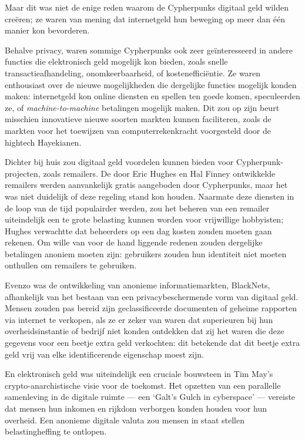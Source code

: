 \documentclass[
  a5paper,
  smalldemyvopaper,11pt,twoside,onecolumn,openright,extrafontsizes]{memoir}
\begin{document}
Maar dit was niet de enige reden waarom de Cypherpunks digitaal geld
wilden creëren; ze waren van mening dat internetgeld hun beweging op
meer dan één manier kon bevorderen.

Behalve privacy, waren sommige Cypherpunks ook zeer geïnteresseerd in
andere functies die elektronisch geld mogelijk kon bieden, zoals snelle
transactieafhandeling, onomkeerbaarheid, of kostenefficiëntie. Ze waren
enthousiast over de nieuwe mogelijkheden die dergelijke functies
mogelijk konden maken: internetgeld kon online diensten en spellen ten
goede komen, speculeerden ze, of \emph{machine-to-machine} betalingen
mogelijk maken. Dit zou op zijn beurt misschien innovatieve nieuwe
soorten markten kunnen faciliteren, zoals de markten voor het toewijzen
van computerrekenkracht voorgesteld door de hightech Hayekianen.

Dichter bij huis zou digitaal geld voordelen kunnen bieden voor
Cypherpunk-projecten, zoals remailers. De door Eric Hughes en Hal Finney
ontwikkelde remailers werden aanvankelijk gratis aangeboden door
Cypherpunks, maar het was niet duidelijk of deze regeling stand kon
houden. Naarmate deze diensten in de loop van de tijd populairder
werden, zou het beheren van een remailer uiteindelijk een te grote
belasting kunnen worden voor vrijwillige hobbyisten; Hughes verwachtte
dat beheerders op een dag kosten zouden moeten gaan rekenen. Om wille
van voor de hand liggende redenen zouden dergelijke betalingen anoniem
moeten zijn: gebruikers zouden hun identiteit niet moeten onthullen om
remailers te gebruiken.

Evenzo was de ontwikkeling van anonieme informatiemarkten, BlackNets,
afhankelijk van het bestaan van een privacybeschermende vorm van
digitaal geld. Mensen zouden pas bereid zijn geclassificeerde documenten
of geheime rapporten via internet te verkopen, als ze er zeker van waren
dat superieuren bij hun overheidsinstantie of bedrijf niet konden
ontdekken dat zij het waren die deze gegevens voor een beetje extra geld
verkochten: dit betekende dat dit beetje extra geld vrij van elke
identificerende eigenschap moest zijn.

En elektronisch geld was uiteindelijk een cruciale bouwsteen in Tim
May's crypto-anarchistische visie voor de toekomst. Het opzetten van een
parallelle samenleving in de digitale ruimte --- een `Galt's Gulch in
cyberspace' --- vereiste dat mensen hun inkomen en rijkdom verborgen
konden houden voor hun overheid. Een anonieme digitale valuta zou mensen
in staat stellen belastingheffing te ontlopen.
\end{document}
